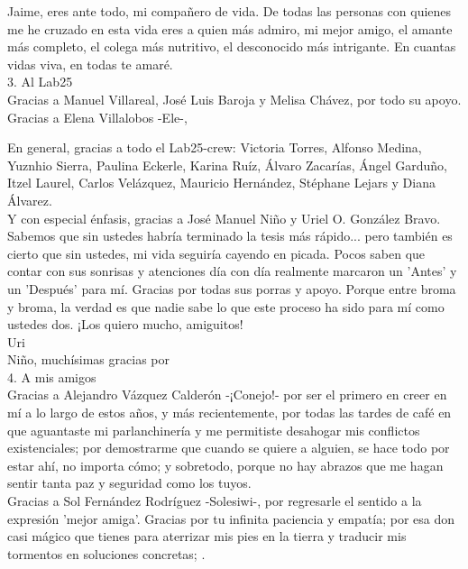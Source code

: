 \documentclass[
12pt, %
spanish, %
singlespacing, %
headsepline, %
]{MastersDoctoralThesis} %
\begin{document}
\begin{acknowledgements}
Jaime, eres ante todo, mi compañero de vida. De todas las personas con quienes me he cruzado en esta vida eres a quien más admiro, mi mejor amigo, el amante más completo, el colega más nutritivo, el desconocido más intrigante. En cuantas vidas viva, en todas te amaré.\\

3. Al Lab25\\

Gracias a Manuel Villareal, José Luis Baroja y Melisa Chávez, por todo su apoyo. Gracias a Elena Villalobos -Ele-,  

En general, gracias a todo el Lab25-crew: Victoria Torres, Alfonso Medina, Yuznhio Sierra, Paulina Eckerle, Karina Ruíz, Álvaro Zacarías, Ángel Garduño, Itzel Laurel, Carlos Velázquez, Mauricio Hernández, Stéphane Lejars y Diana Álvarez.\\


Y con especial énfasis, gracias a José Manuel Niño y Uriel O. González Bravo. Sabemos que sin ustedes habría terminado la tesis más rápido... pero también es cierto que sin ustedes, mi vida seguiría cayendo en picada. Pocos saben que contar con sus sonrisas y atenciones día con día realmente marcaron un 'Antes' y un 'Después' para mí. Gracias por todas sus porras y apoyo. Porque entre broma y broma, la verdad es que nadie sabe lo que este proceso ha sido para mí como ustedes dos. ¡Los quiero mucho, amiguitos!\\

Uri\\

Niño, muchísimas gracias por \\

4. A mis amigos\\


Gracias a Alejandro Vázquez Calderón -¡Conejo!- por ser el primero en creer en mí a lo largo de estos años, y más recientemente, por todas las tardes de café en que aguantaste mi parlanchinería y me permitiste desahogar mis conflictos existenciales; por demostrarme que cuando se quiere a alguien, se hace todo por estar ahí, no importa cómo; y sobretodo, porque no hay abrazos que me hagan sentir tanta paz y seguridad como los tuyos.\\

Gracias a Sol Fernández Rodríguez -Solesiwi-, por regresarle el sentido a la expresión 'mejor amiga'. Gracias por tu infinita paciencia y empatía; por esa don casi mágico que tienes para aterrizar mis pies en la tierra y traducir mis tormentos en soluciones concretas; .\\


\end{acknowledgements}
\end{document}
